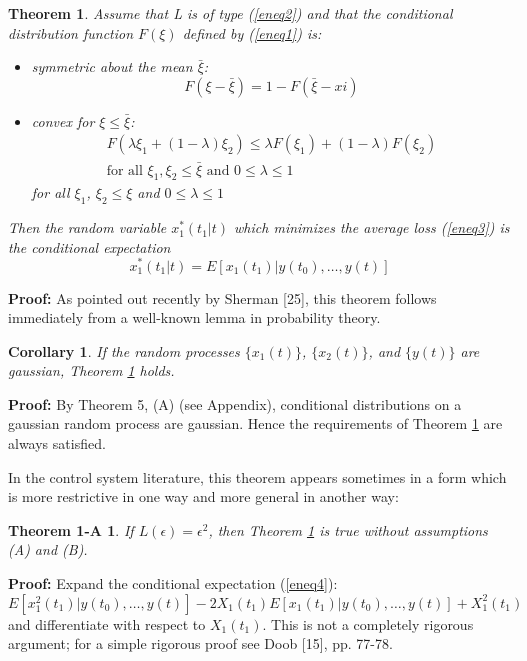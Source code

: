 \documentclass{article}
\newtheorem{theorem}{Theorem}
\newtheorem*{theorem1a}{Theorem 1-A}
\newtheorem*{corollary}{Corollary}
\begin{document}
\begin{theorem}
\label{th1}
Assume that L is of type (\ref{eneq2}) and that the conditional distribution function $F(\xi)$ defined by (\ref{eneq1}) is:
\begin{itemize}
\item[A] symmetric about the mean $\bar{\xi}$:
    \begin{equation*}
    F(\xi-\bar{\xi})=1-F(\bar{\xi}-xi)
    \end{equation*}
\item[B] convex for $\xi \le \bar{\xi}$:
    \begin{multline*}
    F(\lambda\xi_1+(1-\lambda)\xi_2) \le \lambda F(\xi_1)+(1-\lambda)F(\xi_2)\\
    \text{for all }\xi_1,\xi_2 \le \bar{\xi} \text{ and } 0 \le \lambda \le 1
    \end{multline*}
for all $\xi_1$, $\xi_2 \le \xi$ and $0 \le \lambda \le 1$
\end{itemize}
Then the random variable $x_1^\ast(t_1 \vert t)$ which minimizes the average loss (\ref{eneq3}) is the conditional expectation
\begin{equation}
\label{eneq5}
x^{\ast}_1(t_1 \vert t)=E[x_1(t_1) \vert y(t_0),\dotsc,y(t)]
\end{equation}
\end{theorem}

\textbf{Proof:} As pointed out recently by Sherman [25], this theorem follows immediately from a well-known lemma in probability theory.
\begin{corollary}
If the random processes $\{x_1(t)\}$, $\{x_2(t)\}$, and $\{y(t)\}$ are gaussian, Theorem \ref{th1} holds.
\end{corollary}
\textbf{Proof:} By Theorem 5, (A) (see Appendix), conditional distributions on a gaussian random process are gaussian. Hence the requirements of Theorem \ref{th1} are always satisfied.

In the control system literature, this theorem appears sometimes in a form which is more restrictive in one way and more general in another way:
\begin{theorem1a}
\label{th1a}
If $L(\epsilon) = \epsilon^2$, then Theorem \ref{th1} is true without assumptions (A) and (B).
\end{theorem1a}

\textbf{Proof:} Expand the conditional expectation (\ref{eneq4}):
\begin{equation*}
E[x_1^2(t_1) \vert y(t_0),\dotsc,y(t)]-2X_1(t_1)E[x_1(t_1) \vert y(t_0),\dotsc,y(t)]+X_1^2(t_1)
\end{equation*}
and differentiate with respect to $X_1(t_1)$. This is not a completely rigorous argument; for a simple rigorous proof see Doob [15], pp. 77-78.
\end{document}
